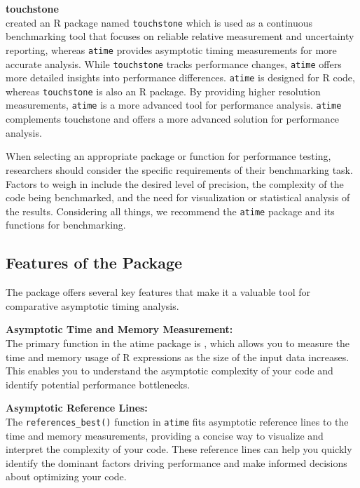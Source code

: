 \textbf{touchstone} \\
\citet{touchstone} created an R package named \texttt{touchstone} which is used as a continuous benchmarking tool that focuses on reliable relative measurement and uncertainty reporting, whereas \texttt{atime} provides asymptotic timing measurements for more accurate analysis. While \texttt{touchstone} tracks performance changes, \texttt{atime} offers more detailed insights into performance differences. \texttt{atime} is designed for R code, whereas \texttt{touchstone} is also an R package. By providing higher resolution measurements, \texttt{atime} is a more advanced tool for performance analysis. \texttt{atime} complements touchstone and offers a more advanced solution for performance analysis.

\noindent When selecting an appropriate package or function for performance testing, researchers should consider the specific requirements of their benchmarking task. Factors to weigh in include the desired level of precision, the complexity of the code being benchmarked, and the need for visualization or statistical analysis of the results. Considering all things, we recommend the \texttt{atime} package and its functions for benchmarking.

\subsection{Features of the Package}
The package offers several key features that make it a valuable tool for comparative asymptotic timing analysis.

\textbf{Asymptotic Time and Memory Measurement:} \\
The primary function in the atime package is , which allows you to measure the time and memory usage of R expressions as the size of the input data increases. This enables you to understand the asymptotic complexity of your code and identify potential performance bottlenecks.
\vspace{0.1in}

\textbf{Asymptotic Reference Lines:} \\
The \texttt{references\_best()} function in \texttt{atime} fits asymptotic reference lines to the time and memory measurements, providing a concise way to visualize and interpret the complexity of your code. These reference lines can help you quickly identify the dominant factors driving performance and make informed decisions about optimizing your code.
\vspace{0.1in}

